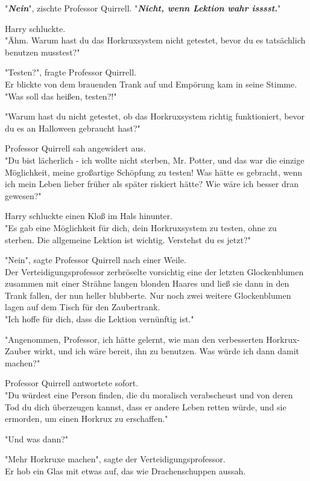 {"\textbf{\emph{Nein}}", zischte Professor Quirrell. "\textbf{\emph{Nicht, wenn Lektion wahr isssst.}}"

Harry schluckte.\\ "Ähm. Warum hast du das Horkruxsystem nicht getestet, bevor du es tatsächlich benutzen musstest?"

"Testen?", fragte Professor Quirrell.\\ Er blickte von dem brauenden Trank auf und Empörung kam in seine Stimme.\\ "Was soll das heißen, testen?!"

"Warum hast du nicht getestet, ob das Horkruxsystem richtig funktioniert, bevor du es an Halloween gebraucht hast?"

Professor Quirrell sah angewidert aus.\\ "Du bist lächerlich - ich wollte nicht sterben, Mr. Potter, und das war die einzige Möglichkeit, meine großartige Schöpfung zu testen! Was hätte es gebracht, wenn ich mein Leben lieber früher als später riskiert hätte? Wie wäre ich besser dran gewesen?"

Harry schluckte einen Kloß im Hals hinunter.\\ "Es gab eine Möglichkeit für dich, dein Horkruxsystem zu testen, ohne zu sterben. Die allgemeine Lektion ist wichtig. Verstehst du es jetzt?"

"Nein", sagte Professor Quirrell nach einer Weile.\\ Der Verteidigungsprofessor zerbröselte vorsichtig eine der letzten Glockenblumen zusammen mit einer Strähne langen blonden Haares und ließ sie dann in den Trank fallen, der nun heller blubberte. Nur noch zwei weitere Glockenblumen lagen auf dem Tisch für den Zaubertrank.\\ "Ich hoffe für dich, dass die Lektion vernünftig ist."

"Angenommen, Professor, ich hätte gelernt, wie man den verbesserten Horkrux-Zauber wirkt, und ich wäre bereit, ihn zu benutzen. Was würde ich dann damit machen?"

Professor Quirrell antwortete sofort.\\ "Du würdest eine Person finden, die du moralisch verabscheust und von deren Tod du dich überzeugen kannst, dass er andere Leben retten würde, und sie ermorden, um einen Horkrux zu erschaffen."

"Und was dann?"

"Mehr Horkruxe machen", sagte der Verteidigungsprofessor.\\ Er hob ein Glas mit etwas auf, das wie Drachenschuppen aussah.

}
